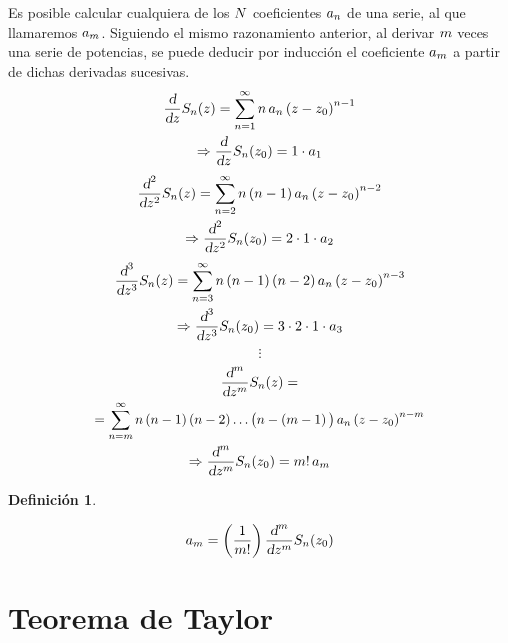 \documentclass[a5paper,12pt,twoside]{book}
\newtheorem{defn}{{Definición}}[chapter]
\begin{document}
Es posible calcular cualquiera de los $N$ coeficientes $a_n$ de una serie, al que llamaremos $a_m$.
Siguiendo el mismo razonamiento anterior, al derivar $m$ veces una serie de potencias, se puede deducir por inducción el coeficiente $a_m$ a partir de dichas derivadas sucesivas.
\begin{multline*}
    \frac{\textsl{d}}{\textsl{d} z} S_n(z) = \sum_{n=1}^\infty n \, a_n \left(z-z_0\right)^{n-1}
    \\
    \Rightarrow \frac{\textsl{d}}{\textsl{d} z} S_n(z_0) = 1 \cdot a_1
\end{multline*}
\begin{multline*}
    \frac{\textsl{d}^2}{\textsl{d} z^2} S_n(z) = \sum_{n=2}^\infty n \left(n-1\right) a_n \left(z-z_0\right)^{n-2}
    \\
    \Rightarrow \frac{\textsl{d}^2}{\textsl{d} z^2} S_n(z_0) = 2 \cdot 1 \cdot a_2
\end{multline*}
\begin{multline*}
    \frac{\textsl{d}^3}{\textsl{d} z^3} S_n(z) = \sum_{n=3}^\infty n \left(n-1\right) \left(n-2\right) a_n \left(z-z_0\right)^{n-3}
    \\
    \Rightarrow \frac{\textsl{d}^3}{\textsl{d} z^3} S_n(z_0) = 3 \cdot 2 \cdot 1 \cdot a_3
\end{multline*}
\begin{equation*}
    \vdots
\end{equation*}
\begin{multline*}
    \frac{\dif^\mth}{\dif z^\mth} S_\nth (z) =
    \\
    \scale{0.96}{
    = \sum_{\nth=\mth}^\infty \nth \left(\nth-1\right) \left(\nth-2\right) \dots \big( \nth-\left(\mth-1\right) \big) \, a_\nth \left(z-z_0\right)^{\nth-\mth}
    }
    \\
    \Rightarrow \frac{\dif^\mth}{\dif z^\mth} S_\nth(z_0) = \mth! \, a_\mth
\end{multline*}

\begin{mdframed}[style=DefinitionFrame]
    \begin{defn}
    \end{defn}
    \begin{equation*}
        a_m = \left( \frac{1}{m!} \right) \frac{\textsl{d}^m}{\textsl{d} z^m} S_n(z_0)
    \end{equation*}
\end{mdframed}


\section{Teorema de Taylor}
\end{document}
